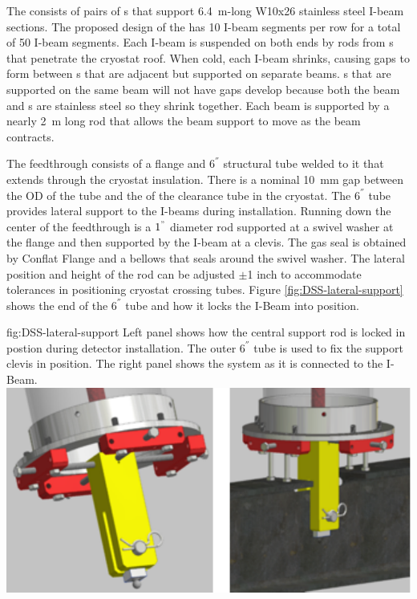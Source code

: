   The 
consists of pairs of \fdth{}s that support \SI{6.4}{m}-long
W10x26 stainless steel I-beam sections. The proposed design of the
 has \num{10} I-beam segments per row for a total of
\num{50} I-beam segments. Each I-beam is suspended on both ends by
rods from \fdth{}s that penetrate the cryostat roof.  %
When cold, each I-beam shrinks, causing gaps to form between
s that are adjacent but supported on separate beams.
s that are supported on the same beam will not have gaps
develop because both the beam and s are stainless steel so
they shrink together.  Each beam is supported by a nearly
\SI{2}{m} long rod that allows the beam support to move as the beam
contracts.


The feedthrough consists of a flange and $6 ^{''}$  structural tube welded to it that extends through the cryostat insulation.  
There is a
nominal \SI{10}{mm} gap between the OD of the tube and the   of the clearance tube in the cryostat.
The $6 ^{''}$ tube provides lateral support to the I-beams during installation.
Running down the center of the feedthrough is a $1^{"}$ diameter rod supported at a swivel washer at the flange and then supported by the
I-beam at a clevis.  The gas seal is obtained by Conflat Flange and a
bellows that seals around the swivel washer.  The lateral position and height of the rod can be adjusted $\pm$1 inch to accommodate tolerances in positioning cryostat crossing tubes. Figure \ref{fig:DSS-lateral-support} shows the end of the $6 ^{''}$ tube and how it locks the I-Beam into position. 

\begin{dunefigure}{fig:DSS-lateral-support}
  {Left panel shows how the central support rod is locked in postion during detector installation. The outer $6 ^{''}$ tube is used to fix the support clevis in position. The right panel shows the system as it is connected to the I-Beam.}
\includegraphics[width=.75\textwidth]{graphics/dss-lateral-support.pdf}
\end{dunefigure}

